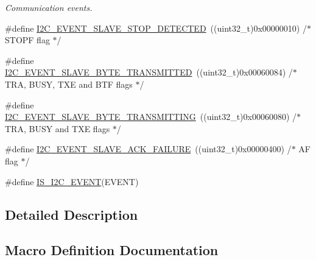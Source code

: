 \begin{DoxyCompactItemize}
\begin{DoxyCompactList}\small\item\em Communication events. \end{DoxyCompactList}\item 
\#define \hyperlink{group___i2_c___events_ga3148d8d7087e418959bc31e2646b2941}{I2\+C\+\_\+\+E\+V\+E\+N\+T\+\_\+\+S\+L\+A\+V\+E\+\_\+\+S\+T\+O\+P\+\_\+\+D\+E\+T\+E\+C\+T\+ED}~((uint32\+\_\+t)0x00000010)  /$\ast$ S\+T\+O\+P\+F flag $\ast$/
\item 
\#define \hyperlink{group___i2_c___events_ga50652880323b8c2746b5afbdfea03fe1}{I2\+C\+\_\+\+E\+V\+E\+N\+T\+\_\+\+S\+L\+A\+V\+E\+\_\+\+B\+Y\+T\+E\+\_\+\+T\+R\+A\+N\+S\+M\+I\+T\+T\+ED}~((uint32\+\_\+t)0x00060084)  /$\ast$ T\+R\+A, B\+U\+S\+Y, T\+X\+E and B\+T\+F flags $\ast$/
\item 
\#define \hyperlink{group___i2_c___events_gaa574c93a99497649f3d8e7ff53796231}{I2\+C\+\_\+\+E\+V\+E\+N\+T\+\_\+\+S\+L\+A\+V\+E\+\_\+\+B\+Y\+T\+E\+\_\+\+T\+R\+A\+N\+S\+M\+I\+T\+T\+I\+NG}~((uint32\+\_\+t)0x00060080)  /$\ast$ T\+R\+A, B\+U\+S\+Y and T\+X\+E flags $\ast$/
\item 
\#define \hyperlink{group___i2_c___events_ga249bd611f1ca64653c0bfc606c591088}{I2\+C\+\_\+\+E\+V\+E\+N\+T\+\_\+\+S\+L\+A\+V\+E\+\_\+\+A\+C\+K\+\_\+\+F\+A\+I\+L\+U\+RE}~((uint32\+\_\+t)0x00000400)  /$\ast$ A\+F flag $\ast$/
\item 
\#define \hyperlink{group___i2_c___events_ga4b42e6936006195f89ff4f763d366970}{I\+S\+\_\+\+I2\+C\+\_\+\+E\+V\+E\+NT}(E\+V\+E\+NT)
\end{DoxyCompactItemize}


\subsection{Detailed Description}


\subsection{Macro Definition Documentation}
\mbox{\label{group___i2_c___events_ga6bcf2ae49961e07e27cf9fdf334719e3}} 
